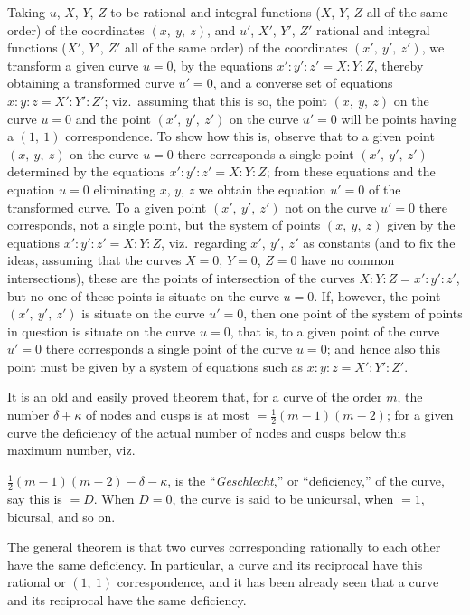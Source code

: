 \documentclass[12pt,a4paper,oneside]{book}
\begin{document}
Taking $u$, $X$, $Y$, $Z$ to be rational and integral functions ($X$, $Y$, $Z$ all of the same order) of the coordinates $(x,\ y,\ z)$, and $u'$, $X'$, $Y'$, $Z'$ rational and integral functions ($X'$, $Y'$, $Z'$ all of the same order) of the coordinates $(x',\ y',\ z')$, we transform a given curve $u=0$, by the equations $x':y':z'=X:Y:Z$, thereby obtaining a transformed curve $u'=0$, and a converse set of equations $x:y:z=X':Y':Z'$; viz.\ assuming that this is so, the point $(x,\ y,\ z)$ on the curve $u=0$ and the point $(x',\ y',\ z')$ on the curve $u'=0$ will be points having a $(1,\ 1)$ correspondence. To show how this is, observe that to a given point $(x,\ y,\ z)$ on the curve $u=0$ there corresponds a single point $(x',\ y',\ z')$ determined by the equations $x':y':z'=X:Y:Z$; from these equations and the equation $u=0$ eliminating $x$, $y$, $z$ we obtain the equation $u'=0$ of the transformed curve. To a given point $(x',\ y',\ z')$ not on the curve $u'=0$ there corresponds, not a single point, but the system of points $(x,\ y,\ z)$ given by the equations $x':y':z'=X:Y:Z$, viz.\ regarding $x',\ y',\ z'$ as constants (and to fix the ideas, assuming that the curves $X=0$, $Y=0$, $Z=0$ have no common intersections), these are the points of intersection of the curves $X:Y:Z=x':y':z'$, but no one of these points is situate on the curve $u=0$. If, however, the point $(x',\ y',\ z')$ is situate on the curve $u'=0$, then one point of the system of points in question is situate on the curve $u=0$, that is, to a given point of the curve $u'=0$ there corresponds a single point of the curve $u=0$; and hence also this point must be given by a system of equations such as $x:y:z=X':Y':Z'$.

It is an old and easily proved theorem that, for a curve of the order $m$, the number $\delta+\kappa$ of nodes and cusps is at most $=\tfrac{1}{2}(m-1)(m-2)$; for a given curve the deficiency of the actual number of nodes and cusps below this maximum number, viz.

\newpage
$\tfrac{1}{2}(m-1)(m-2)-\delta-\kappa$, is the ``\textit{Geschlecht},'' or ``deficiency,'' of the curve, say this is $=D$. When $D=0$, the curve is said to be unicursal, when $=1$, bicursal, and so on.

The general theorem is that two curves corresponding rationally to each other have the same deficiency. In particular, a curve and its reciprocal have this rational or $(1,\ 1)$ correspondence, and it has been already seen that a curve and its reciprocal have the same deficiency.
\end{document}
